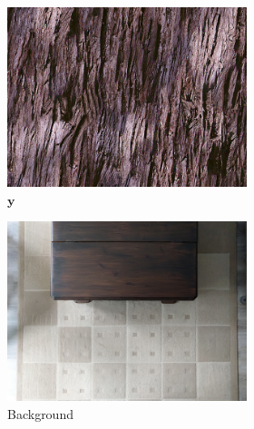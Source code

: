 \begin{figure}[]
    \begin{subfigure}{\textwidth}
        \centering
        \begin{subfigure}{0.24\textwidth}
            \centering
            \includegraphics[width=\textwidth]{images/04-experiment02/carpet/wood/target.jpg}
            \caption*{\(\bm{y}\)}
        \end{subfigure}
        \hfill
        \begin{subfigure}{0.24\textwidth}
            \centering
            \includegraphics[width=\textwidth]{images/04-experiment02/carpet/bg.jpg}
            \caption*{Background}
        \end{subfigure}
        \hfill
        \begin{subfigure}{0.24\textwidth}

\end{subfigure}
\end{subfigure}
\end{figure}
